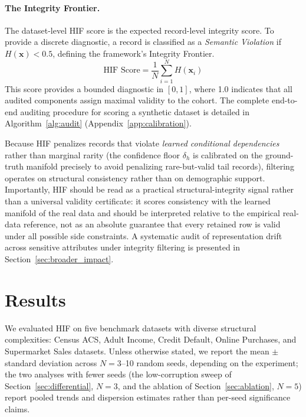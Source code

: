 \documentclass[pdflatex,sn-mathphys-num]{sn-jnl}
\theoremstyle{thmstyleone}%
\theoremstyle{thmstyletwo}%
\theoremstyle{thmstylethree}%
\begin{document}
\paragraph{The Integrity Frontier.} The dataset-level HIF score is the expected record-level integrity score. To provide a discrete diagnostic, a record is classified as a \textit{Semantic Violation} if $H(\mathbf{x}) < 0.5$, defining the framework's Integrity Frontier.
\begin{equation}
    \text{HIF Score} = \frac{1}{N} \sum_{i=1}^N H(\mathbf{x}_i)
\end{equation}
This score provides a bounded diagnostic in $[0, 1]$, where 1.0 indicates that all audited components assign maximal validity to the cohort. The complete end-to-end auditing procedure for scoring a synthetic dataset is detailed in Algorithm~\ref{alg:audit} (Appendix~\ref{app:calibration}).

Because HIF penalizes records that violate \textit{learned conditional dependencies} rather than marginal rarity (the confidence floor $\delta_h$ is calibrated on the ground-truth manifold precisely to avoid penalizing rare-but-valid tail records), filtering operates on structural consistency rather than on demographic support. Importantly, HIF should be read as a practical structural-integrity signal rather than a universal validity certificate: it scores consistency with the learned manifold of the real data and should be interpreted relative to the empirical real-data reference, not as an absolute guarantee that every retained row is valid under all possible side constraints. A systematic audit of representation drift across sensitive attributes under integrity filtering is presented in Section~\ref{sec:broader_impact}.

\section{Results}\label{sec:results}

We evaluated HIF on five benchmark datasets with diverse structural complexities: Census ACS, Adult Income, Credit Default, Online Purchases, and Supermarket Sales datasets. Unless otherwise stated, we report the mean $\pm$ standard deviation across $N=3$--10 random seeds, depending on the experiment; the two analyses with fewer seeds (the low-corruption sweep of Section~\ref{sec:differential}, $N=3$, and the ablation of Section~\ref{sec:ablation}, $N=5$) report pooled trends and dispersion estimates rather than per-seed significance claims.
\end{document}
